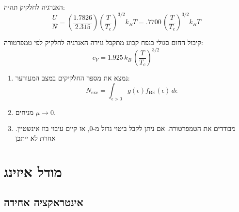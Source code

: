 \documentclass{tstextbook}
\begin{document}
\begin{corollary}
האנרגיה לחלקיק תהיה:
$${\frac{U}{N}}=\left({\frac{1.7826}{2.315}}\right)\left({\frac{T}{T_c}}\right)^{3/2}k_{B}T=.7700\,\left({\frac{T}{T_c}}\right)^{3/2}k_{B}T$$

\end{corollary}
\begin{corollary}
קיבול החום סגולי בנפח קבוע מתקבל גזירה האנרגיה לחלקיק לפי טמפרטורה:
$$c_{V}=1.925\,k_{B}\,\left(\frac{T}{T_c}\right)^{3/2}$$

\end{corollary}
\begin{proposition}
  \begin{enumerate}
    \item נמצא את מספר החלקיקים במצב המעורער: 
$$N_{\mathrm{exc}}=\int_{\epsilon>0}g(\epsilon)f_{\mathrm{BE}}(\epsilon)\,d\epsilon$$


    \item מניחים \(\mu\to 0\).  


    \item מבודדים את הטמפרטורה. אם ניתן לקבל ביטוי גדול מ-0, אז קיים עיבוי בוז אינשטיין. אחרת לא ייתכן 


  \end{enumerate}
\end{proposition}
\begin{example}
\end{example}
\chapter{מודל איזינג}

\section{אינטראקציה אחידה}
\end{document}
